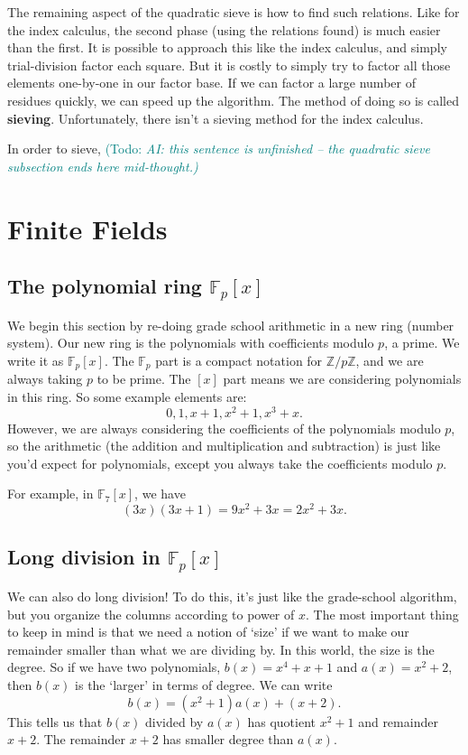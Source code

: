 \documentclass{article}
\theoremstyle{plain}
\theoremstyle{definition}
\theoremstyle{remark}
\numberwithin{theorem}{section}
\newcommand{\todo}[1]{\textcolor{teal}{{\sf (Todo:} {\sl{#1})}}}
\newcommand{\todo}[1]{}
\newcommand{\FF}{\mathbb{F}}
\newcommand{\ZZ}{\mathbb{Z}}
\begin{document}
The remaining aspect of the quadratic sieve is how to find such relations.  Like for the index calculus, the second phase (using the relations found) is much easier than the first.   It is possible to approach this like the index calculus, and simply trial-division factor each square. 
 But it is costly to simply try to factor all those elements one-by-one in our factor base. If we can factor a large number of residues quickly, we can speed up the algorithm.  The method of doing so is called \textbf{sieving}.  Unfortunately, there isn't a sieving method for the index calculus.

 In order to sieve, \todo{AI: this sentence is unfinished -- the quadratic sieve subsection ends here mid-thought.}

\section{Finite Fields}
\label{sec:finite-fields}

\subsection{The polynomial ring $\FF_p[x]$}

We begin this section by re-doing grade school arithmetic in a new ring (number system).  Our new ring is the polynomials with coefficients modulo $p$, a prime.  We write it as $\FF_p[x]$.  The $\FF_p$ part is a compact notation for $\ZZ/p\ZZ$, and we are always taking $p$ to be prime.  The $[x]$ part means we are considering polynomials in this ring.  So some example elements are:
\[
0, 1, x+1, x^2 + 1, x^3 + x.
\]
However, we are always considering the coefficients of the polynomials modulo $p$, so the arithmetic (the addition and multiplication and subtraction) is just like you'd expect for polynomials, except you always take the coefficients modulo $p$.

For example, in $\FF_7[x]$, we have
\[
(3x)(3x+1) = 9x^2 + 3x = 2x^2 + 3x.
\]

\subsection{Long division in $\FF_p[x]$}

We can also do long division!  To do this, it's just like the grade-school algorithm, but you organize the columns according to power of $x$.  The most important thing to keep in mind is that we need a notion of `size' if we want to make our remainder smaller than what we are dividing by.  In this world, the size is the degree.  So if we have two polynomials, $b(x) = x^4 + x + 1$ and $a(x) = x^2 + 2$, then $b(x)$ is the `larger' in terms of degree.  We can write
\[
b(x) = (x^2+1) a(x) + (x+2).
\]
This tells us that $b(x)$ divided by $a(x)$ has quotient $x^2+1$ and remainder $x+2$.  The remainder $x+2$ has smaller degree than $a(x)$.
\end{document}
